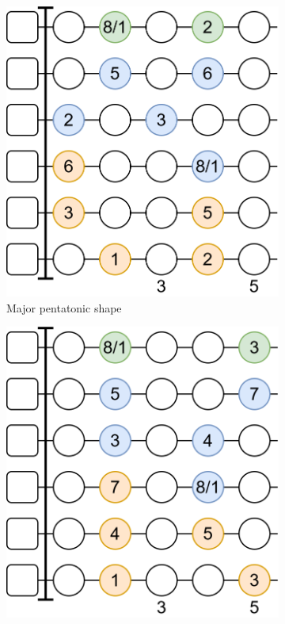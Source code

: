 \begin{figure}[h]
	\begin{subfigure}[b]{0.45\textwidth}
		\includegraphics[width=\textwidth]{../../Images/guitar_major_pentatonic_standard.png}
		\caption{Major pentatonic shape}
		\label{fig:guitar_major_pentatonic_shape}
	\end{subfigure}
	\hfill
	\begin{subfigure}[b]{0.45\textwidth}
		\includegraphics[width=\textwidth]{../../Images/guitar_minor_pentatonic_standard.png}

\end{subfigure}
\end{figure}
